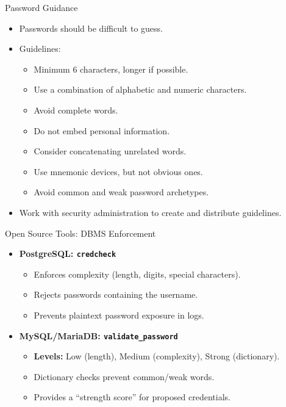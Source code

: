 \documentclass[aspectratio=169]{beamer}
\begin{document}
\begin{frame}{Password Guidance}
  \begin{itemize}
    \item Passwords should be difficult to guess.
    \item Guidelines:
      \begin{itemize}
        \item Minimum 6 characters, longer if possible.
        \item Use a combination of alphabetic and numeric characters.
        \item Avoid complete words.
        \item Do not embed personal information.
        \item Consider concatenating unrelated words.
        \item Use mnemonic devices, but not obvious ones.
        \item Avoid common and weak password archetypes.
      \end{itemize}
    \item Work with security administration to create and distribute guidelines.
  \end{itemize}
\end{frame}

\begin{frame}{Open Source Tools: DBMS Enforcement}
    \begin{itemize}
        \item \textbf{PostgreSQL: \texttt{credcheck}}
        \begin{itemize}
            \item Enforces complexity (length, digits, special characters).
            \item Rejects passwords containing the username.
            \item Prevents plaintext password exposure in logs.
        \end{itemize}
        \item \textbf{MySQL/MariaDB: \texttt{validate\_password}}
        \begin{itemize}
            \item \textbf{Levels:} Low (length), Medium (complexity), Strong (dictionary).
            \item Dictionary checks prevent common/weak words.
            \item Provides a ``strength score'' for proposed credentials.
        \end{itemize}
    \end{itemize}
\end{frame}
\end{document}

